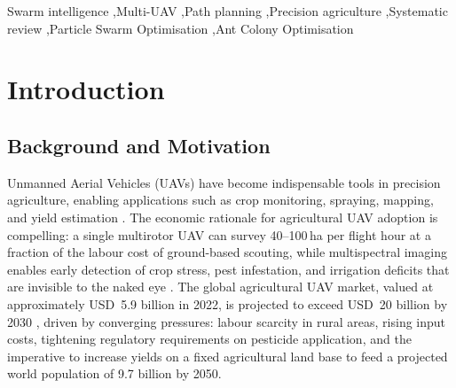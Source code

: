 \documentclass[review,3p,times]{elsarticle}
\begin{document}
\begin{frontmatter}
\begin{abstract}
\textbf{Conclusions:} Current research on SI-based multi-UAV path planning in
agriculture remains heavily simulation-oriented and lacks standardised benchmarking
frameworks. This study provides the first structured gap analysis for this domain,
documents 171 research gaps across four dimensions---Technological (51, 29.8\%),
Practical (52, 30.4\%), Methodological (39, 22.8\%), and Theoretical (29, 17.0\%)---
and proposes a research agenda emphasising experimental validation, dynamic
environment modelling, and standardised evaluation metrics through the open
AgriSwarm-Bench framework to accelerate practical deployment of swarm-based
agricultural UAV systems.
\end{abstract}

\begin{keyword}
Swarm intelligence \sep Multi-UAV \sep Path planning \sep Precision agriculture \sep Systematic review \sep Particle Swarm Optimisation \sep Ant Colony Optimisation
\end{keyword}

\end{frontmatter}

\section{Introduction}

\subsection{Background and Motivation}

Unmanned Aerial Vehicles (UAVs) have become indispensable tools in precision agriculture, enabling applications such as crop monitoring, spraying, mapping, and yield estimation \cite{zhang2012,tsouros2019,puri2017,mogili2018,hunt2018}. The economic rationale for agricultural UAV adoption is compelling: a single multirotor UAV can survey 40--100\,ha per flight hour at a fraction of the labour cost of ground-based scouting, while multispectral imaging enables early detection of crop stress, pest infestation, and irrigation deficits that are invisible to the naked eye \cite{hunt2018,zhang2012}. The global agricultural UAV market, valued at approximately USD~5.9 billion in 2022, is projected to exceed USD~20 billion by 2030 \cite{tsouros2019,mogili2018}, driven by converging pressures: labour scarcity in rural areas, rising input costs, tightening regulatory requirements on pesticide application, and the imperative to increase yields on a fixed agricultural land base to feed a projected world population of 9.7 billion by 2050.
\end{document}
